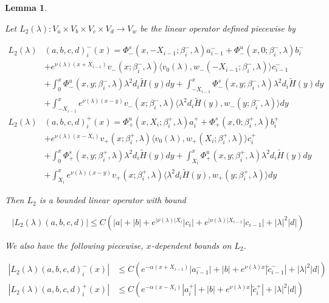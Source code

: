\documentclass[12pt]{article}
\newtheorem{lemma}{Lemma}
\begin{document}
\begin{lemma}\label{L2}

Let $L_2(\lambda): V_a \times V_b \times V_c \times V_d \rightarrow V_w$ be the linear operator defined piecewise by

\begin{align*}
L_2(\lambda)&(a,b,c,d)_i^-(x) = \Phi^s_-(x, -X_{i-1}; \beta_i^-, \lambda)a_{i-1}^- + \Phi^u_-(x, 0; \beta_i^-, \lambda)b_i^- \\
&+ e^{\nu(\lambda)(x+X_{i-1})} v_-(x; \beta_i^-, \lambda) \langle v_0(\lambda), w_-(-X_{i-1}; \beta_i^-, \lambda) \rangle c_{i-1}^- \\
&+ \int_0^x \Phi^u_-(x, y; \beta_i^-, \lambda)\lambda^2 d_i \tilde{H}(y) dy + \int_{-X_{i-1}}^x \Phi^s_-(x, y; \beta_i^-, \lambda) \lambda^2 d_i \tilde{H}(y) dy \\
&+ \int_{-X_{i-1}}^x
e^{\nu(\lambda)(x-y)} v_-(x; \beta_i^-, \lambda) \langle \lambda^2 d_i \tilde{H}(y), w_-(y; \beta_i^-, \lambda) \rangle dy \\
L_2(\lambda)&(a,b,c,d)_i^+(x) = \Phi^u_+(x, X_i; \beta_i^+, \lambda)a_i^+ + \Phi^s_+(x, 0; \beta_i^+, \lambda)b_i^+ \\
&+ e^{\nu(\lambda)(x - X_i)} v_+(x; \beta_i^+, \lambda) \langle v_0(\lambda), w_+(X_i; \beta_i^+, \lambda) \rangle c_i^+ \\
&+ \int_0^x \Phi^s_+(x, y; \beta_i^+, \lambda) \lambda^2 d_i \tilde{H}(y) dy + \int_{X_i}^x \Phi^u_+(x, y; \beta_i^+, \lambda) \lambda^2 d_i \tilde{H}(y) dy \\
&+ \int_{X_i}^x e^{\nu(\lambda)(x-y)} v_+(x; \beta_i^+, \lambda) \langle \lambda^2 d_i \tilde{H}(y), w_+(y; \beta_i^+, \lambda) \rangle dy
\end{align*}

Then $L_2$ is a bounded linear operator with bound

\begin{equation}\label{L2bound}
|L_2(\lambda)(a,b,c,d)| \leq C (|a| + |b| + e^{|\nu(\lambda)|X_i}|c_i| + e^{|\nu(\lambda)|X_{i-1}}|c_{i-1}| + |\lambda|^2 |d| )
\end{equation}

We also have the following piecewise, $x$-dependent bounds on $L_2$.

\begin{align*}
|L_2(\lambda)(a,b,c,d)_i^-(x)| &\leq C (e^{-\alpha(x + X_{i-1})}|a_{i-1}^-| + |b| + e^{\nu(\lambda)x} |\tilde{c}_{i-1}^-| + |\lambda|^2 |d| ) \\
|L_2(\lambda)(a,b,c,d)_i^+(x)| &\leq C (e^{-\alpha(x - X_i)}|a_i^+| + |b| + e^{\nu(\lambda)x} |\tilde{c}_i^+| + |\lambda|^2 |d| ) 
\end{align*}


\end{lemma}
\end{document}
